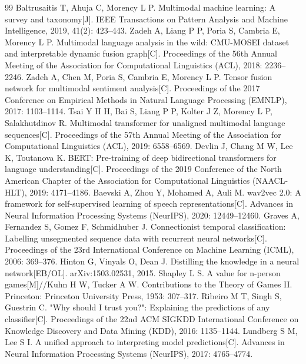 \begin{thebibliography}{99}
 Baltrusaitis T, Ahuja C, Morency L P. Multimodal machine learning: A survey and taxonomy[J]. IEEE Transactions on Pattern Analysis and Machine Intelligence, 2019, 41(2): 423--443.
 Zadeh A, Liang P P, Poria S, Cambria E, Morency L P. Multimodal language analysis in the wild: CMU-MOSEI dataset and interpretable dynamic fusion graph[C]. Proceedings of the 56th Annual Meeting of the Association for Computational Linguistics (ACL), 2018: 2236--2246.
 Zadeh A, Chen M, Poria S, Cambria E, Morency L P. Tensor fusion network for multimodal sentiment analysis[C]. Proceedings of the 2017 Conference on Empirical Methods in Natural Language Processing (EMNLP), 2017: 1103--1114.
 Tsai Y H H, Bai S, Liang P P, Kolter J Z, Morency L P, Salakhutdinov R. Multimodal transformer for unaligned multimodal language sequences[C]. Proceedings of the 57th Annual Meeting of the Association for Computational Linguistics (ACL), 2019: 6558--6569.
 Devlin J, Chang M W, Lee K, Toutanova K. BERT: Pre-training of deep bidirectional transformers for language understanding[C]. Proceedings of the 2019 Conference of the North American Chapter of the Association for Computational Linguistics (NAACL-HLT), 2019: 4171--4186.
 Baevski A, Zhou Y, Mohamed A, Auli M. wav2vec 2.0: A framework for self-supervised learning of speech representations[C]. Advances in Neural Information Processing Systems (NeurIPS), 2020: 12449--12460.
 Graves A, Fernandez S, Gomez F, Schmidhuber J. Connectionist temporal classification: Labelling unsegmented sequence data with recurrent neural networks[C]. Proceedings of the 23rd International Conference on Machine Learning (ICML), 2006: 369--376.
 Hinton G, Vinyals O, Dean J. Distilling the knowledge in a neural network[EB/OL]. arXiv:1503.02531, 2015.
 Shapley L S. A value for n-person games[M]//Kuhn H W, Tucker A W. Contributions to the Theory of Games II. Princeton: Princeton University Press, 1953: 307--317.
 Ribeiro M T, Singh S, Guestrin C. "Why should I trust you?": Explaining the predictions of any classifier[C]. Proceedings of the 22nd ACM SIGKDD International Conference on Knowledge Discovery and Data Mining (KDD), 2016: 1135--1144.
 Lundberg S M, Lee S I. A unified approach to interpreting model predictions[C]. Advances in Neural Information Processing Systems (NeurIPS), 2017: 4765--4774.
\end{thebibliography}

